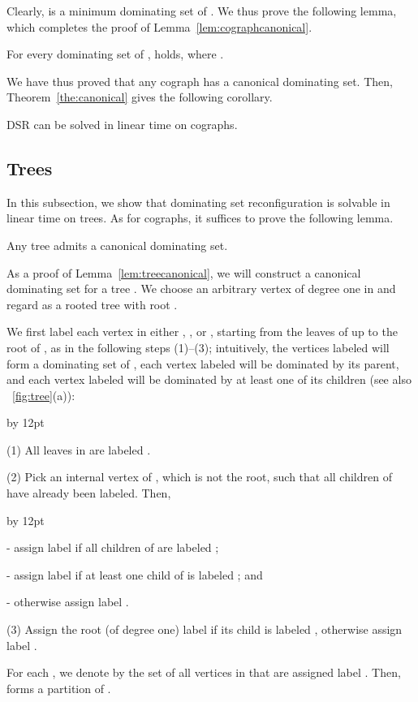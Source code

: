 \documentclass{llncs}
\newenvironment{listing}[1]{\begin{list}{*}{\settowidth{\labelwidth}{#1}\setlength{\leftmargin}{\labelwidth}\advance \leftmargin by 12pt
\setlength{\itemsep}{0pt}\setlength{\parsep}{0pt}\setlength{\topsep}{0pt}\setlength{\parskip}{0pt}}}{\end{list}}
\begin{document}
\noindent
Clearly,  is a minimum dominating set of .
We thus prove the following lemma, which completes the proof of Lemma~\ref{lem:cographcanonical}.

\begin{lemma}[*]\label{lem:cograph03}
For every dominating set  of ,  holds, where .
\end{lemma}

We have thus proved that any cograph has a canonical dominating set.
Then, Theorem~\ref{the:canonical} gives the following corollary.

\begin{corollary}
{\sc DSR} can be solved in linear time on cographs.
\end{corollary}

\subsection{Trees}\label{dsr:altree}

In this subsection, we show that {\sc dominating set reconfiguration} is solvable in linear time on trees.
As for cographs, it suffices to prove the following lemma.

\begin{lemma} \label{lem:treecanonical}
Any tree admits a canonical dominating set.
\end{lemma}

As a proof of Lemma~\ref{lem:treecanonical}, we will construct a canonical dominating set for a tree .
We choose an arbitrary vertex  of degree one in  and regard  as a rooted tree with root .

We first label each vertex in  either , , or , starting from the
leaves of  up to the root  of , as in the following steps (1)--(3);
intuitively, the vertices labeled  will form a dominating set of ,
each vertex labeled  will be dominated by its parent, and
each vertex labeled  will be dominated by at least one of its children
(see also \figurename~\ref{fig:tree}(a)):

\begin{listing}{aaa}
	\item[(1)] All leaves in  are labeled .
	\item[(2)] Pick an internal vertex  of , which is not the root, such that all children of  have already been labeled.
					Then,
					\begin{listing}{a}
					\item[-] assign  label  if all children of  are labeled ;
					\item[-] assign  label  if at least one child of  is labeled ; and
					\item[-] otherwise assign  label .
					\end{listing}
	\item[(3)] Assign the root  (of degree one) label  if its child is labeled , otherwise assign  label .
\end{listing}
For each , we denote by  the set of all vertices in  that are assigned label .
Then,  forms a partition of .
\end{document}
